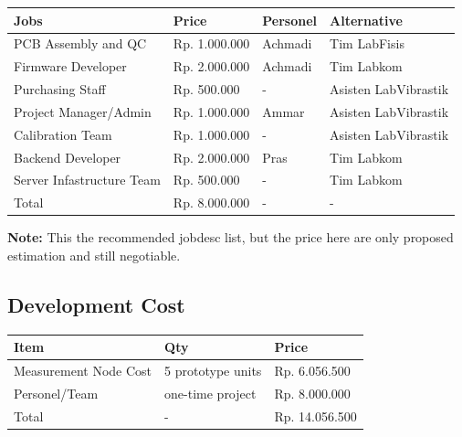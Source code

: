 \documentclass[a4paper,12pt,oneside,pdflatex,italian,final,twocolumn]{article}
\begin{document}
	\begin{tabular}{|l|l|l|l|}
		\toprule
		Jobs & Price & Personel & Alternative \\
		\midrule
		PCB Assembly and QC & Rp. 1.000.000 & Achmadi & Tim LabFisis \\
		Firmware Developer & Rp. 2.000.000 & Achmadi & Tim Labkom \\
		Purchasing Staff & Rp. 500.000 & - & Asisten LabVibrastik \\
		Project Manager/Admin & Rp. 1.000.000 & Ammar & Asisten LabVibrastik \\
		Calibration Team & Rp. 1.000.000 & - &  Asisten LabVibrastik \\
		Backend Developer & Rp. 2.000.000 & Pras & Tim Labkom \\
		Server Infastructure Team & Rp. 500.000 & - & Tim Labkom \\
		\midrule
		Total & Rp. 8.000.000  & - & - \\
		\bottomrule
	\end{tabular}

	\vspace{5pt}
	\textbf{Note:} This the recommended jobdesc list, but the price here are only proposed estimation and still negotiable.

	\subsection{Development Cost}

	\begin{tabular}{|l|l|l|}
		\toprule
		Item & Qty & Price \\
		\midrule
		Measurement Node Cost & 5 prototype units & Rp. 6.056.500 \\
		Personel/Team & one-time project & Rp. 8.000.000 \\
		\midrule
		Total & - & Rp. 14.056.500 \\
		\bottomrule
	\end{tabular}
\end{document}

